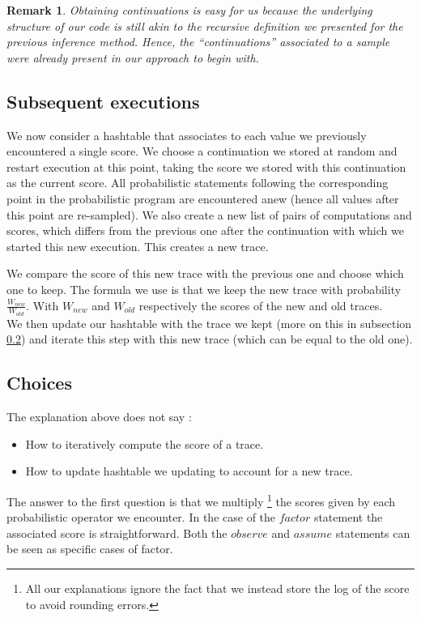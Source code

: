 \documentclass{article}
\newtheorem{remark}{Remark}
\begin{document}
	\begin{remark}
	  Obtaining continuations is easy for us because the underlying structure of our code is still akin to the recursive definition we presented for the previous inference method.
	  Hence, the ``continuations'' associated to a sample were already present in our approach to begin with.
	\end{remark}

	\subsection{Subsequent executions}

	We now consider a hashtable that associates to each value we previously encountered a single score. 
	We choose a continuation we stored at random and restart execution at this point, taking the score we stored with this continuation as the current score. 
	All probabilistic statements following the corresponding point in the probabilistic program are encountered anew (hence all values after this point are re-sampled).
	We also create a new list of pairs of computations and scores, which differs from the previous one after the continuation with which we started this new execution.
	This creates a new trace.

	We compare the score of this new trace with the previous one and choose which one to keep.
	The formula we use is that we keep the new trace with probability $\frac{W_{new}}{W_{old}}$. 
	With $W_{new}$ and $W_{old}$ respectively the scores of the new and old traces. \\

	We then update our hashtable with the trace we kept (more on this in subsection \ref{subseq:choice}) and iterate this step with this new trace (which can be equal to the old one).

	\subsection{Choices}
	\label{subseq:choice}

	The explanation above does not say :
	\begin{itemize}
	  \item How to iteratively compute the score of a trace.
	  \item How to update hashtable we updating to account for a new trace.
	\end{itemize}

	The answer to the first question is that we multiply 
	\footnote{All our explanations ignore the fact that we instead store the log of the score to avoid rounding errors.}
	the scores given by each probabilistic operator we encounter.
	In the case of the $factor$ statement the associated score is straightforward. 
	Both the $observe$ and $assume$ statements can be seen as specific cases of factor.
\end{document}
